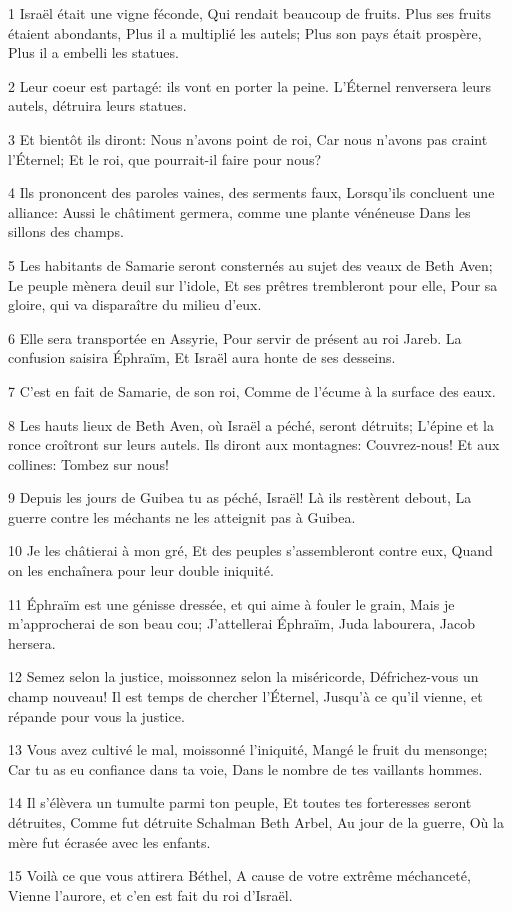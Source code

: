 \par 1 Israël était une vigne féconde, Qui rendait beaucoup de fruits. Plus ses fruits étaient abondants, Plus il a multiplié les autels; Plus son pays était prospère, Plus il a embelli les statues.
\par 2 Leur coeur est partagé: ils vont en porter la peine. L'Éternel renversera leurs autels, détruira leurs statues.
\par 3 Et bientôt ils diront: Nous n'avons point de roi, Car nous n'avons pas craint l'Éternel; Et le roi, que pourrait-il faire pour nous?
\par 4 Ils prononcent des paroles vaines, des serments faux, Lorsqu'ils concluent une alliance: Aussi le châtiment germera, comme une plante vénéneuse Dans les sillons des champs.
\par 5 Les habitants de Samarie seront consternés au sujet des veaux de Beth Aven; Le peuple mènera deuil sur l'idole, Et ses prêtres trembleront pour elle, Pour sa gloire, qui va disparaître du milieu d'eux.
\par 6 Elle sera transportée en Assyrie, Pour servir de présent au roi Jareb. La confusion saisira Éphraïm, Et Israël aura honte de ses desseins.
\par 7 C'est en fait de Samarie, de son roi, Comme de l'écume à la surface des eaux.
\par 8 Les hauts lieux de Beth Aven, où Israël a péché, seront détruits; L'épine et la ronce croîtront sur leurs autels. Ils diront aux montagnes: Couvrez-nous! Et aux collines: Tombez sur nous!
\par 9 Depuis les jours de Guibea tu as péché, Israël! Là ils restèrent debout, La guerre contre les méchants ne les atteignit pas à Guibea.
\par 10 Je les châtierai à mon gré, Et des peuples s'assembleront contre eux, Quand on les enchaînera pour leur double iniquité.
\par 11 Éphraïm est une génisse dressée, et qui aime à fouler le grain, Mais je m'approcherai de son beau cou; J'attellerai Éphraïm, Juda labourera, Jacob hersera.
\par 12 Semez selon la justice, moissonnez selon la miséricorde, Défrichez-vous un champ nouveau! Il est temps de chercher l'Éternel, Jusqu'à ce qu'il vienne, et répande pour vous la justice.
\par 13 Vous avez cultivé le mal, moissonné l'iniquité, Mangé le fruit du mensonge; Car tu as eu confiance dans ta voie, Dans le nombre de tes vaillants hommes.
\par 14 Il s'élèvera un tumulte parmi ton peuple, Et toutes tes forteresses seront détruites, Comme fut détruite Schalman Beth Arbel, Au jour de la guerre, Où la mère fut écrasée avec les enfants.
\par 15 Voilà ce que vous attirera Béthel, A cause de votre extrême méchanceté, Vienne l'aurore, et c'en est fait du roi d'Israël.

